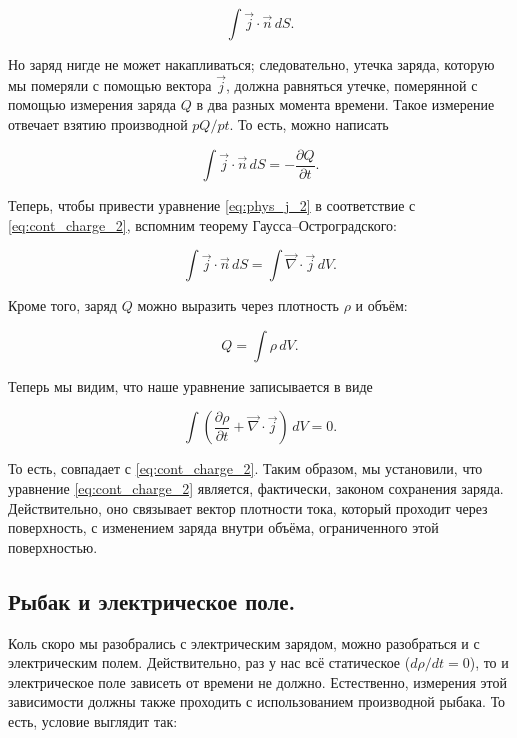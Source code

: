 \documentclass[a4paper,12pt]{article}
\newcommand{\pt}{\partial}
\newcommand{\vn}{\vec{\nabla}}
\begin{document}
\begin{equation}
  \label{eq:phys_j_1}
  \int \vec{j} \cdot \vec{n}\, dS. 
\end{equation}

Но заряд нигде не может накапливаться; следовательно, утечка заряда,
которую мы померяли с помощью вектора $\vec{j}$, должна равняться
утечке, померянной с помощью измерения заряда $Q$ в два разных момента
времени. Такое измерение отвечает взятию производной $pQ/pt$. То есть,
можно написать

\begin{equation}
  \label{eq:phys_j_2}
  \int \vec{j} \cdot \vec{n}\, dS = -\frac{\pt Q}{\pt t}.  
\end{equation}

Теперь, чтобы привести уравнение \eqref{eq:phys_j_2} в соответствие с
\eqref{eq:cont_charge_2}, вспомним теорему Гаусса--Остроградского: 

\begin{equation}
  \label{eq:phys_j_3}
   \int \vec{j} \cdot \vec{n}\, dS = \int \vn \cdot \vec{j}\, dV.
\end{equation}

Кроме того, заряд $Q$ можно выразить через плотность $\rho$ и объём: 

\begin{equation}
  \label{eq:phys_j_4}
  Q = \int \rho \, dV.
\end{equation}

Теперь мы видим, что наше уравнение записывается в виде 

\begin{equation}
  \label{eq:phys_j_5}
  \int \left( \frac{\pt \rho}{\pt t} + \vn \cdot \vec{j}  \right)\, dV
  = 0.
\end{equation}

То есть, совпадает с \eqref{eq:cont_charge_2}. Таким образом, мы
установили, что уравнение \eqref{eq:cont_charge_2} является,
фактически, законом сохранения заряда. Действительно, оно связывает
вектор плотности тока, который проходит через поверхность, с
изменением заряда внутри объёма, ограниченного этой поверхностью.

\subsection{Рыбак и электрическое поле.}
\label{sec:maxwell_eq_4}

Коль скоро мы разобрались с электрическим зарядом, можно разобраться и
с электрическим полем. Действительно, раз у нас всё статическое ($d\rho
/dt=0$), то и электрическое поле зависеть от времени не
должно. Естественно, измерения этой зависимости должны также проходить
с использованием производной рыбака. То есть, условие выглядит так: 
\end{document}
